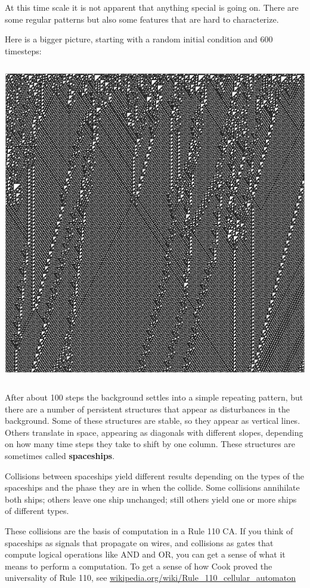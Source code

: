 \documentclass[10pt]{book}
\begin{document}
At this time scale it is not apparent that anything special is
going on.  There are some regular patterns but also some features
that are hard to characterize.

Here is a bigger picture, starting with a random initial
condition and 600 timesteps:

\beforefig
\centerline{\includegraphics[width=5.5in,height=5.5in]{figs/rule110random.eps}}
\afterfig

After about 100 steps the background settles into a simple repeating
pattern, but there are a number of persistent structures that appear
as disturbances in the background.  Some of these structures
are stable, so they appear as vertical lines.  Others translate in
space, appearing as diagonals with different slopes, depending on
how many time steps they take to shift by one column.  These
structures are sometimes called {\bf spaceships}.

Collisions between spaceships yield different results
depending on the types of the spaceships and the phase they are in
when the collide.  Some collisions annihilate both ships; others
leave one ship unchanged; still others yield one or more ships of
different types.

These collisions are the basis of computation in a Rule 110 CA.  If
you think of spaceships as signals that propagate on wires, and
collisions as gates that compute logical operations like AND and OR,
you can get a sense of what it means to perform a computation.
To get a sense of how Cook proved the universality of Rule 110,
see \url{wikipedia.org/wiki/Rule_110_cellular_automaton}
\end{document}
